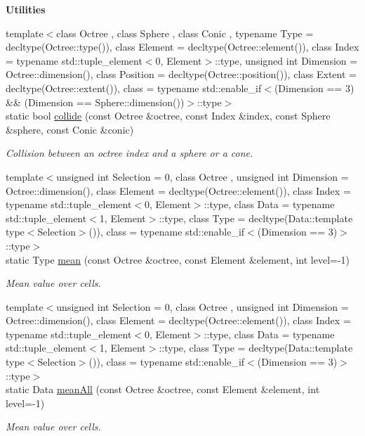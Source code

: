 \begin{Indent}{\bf Utilities}
\begin{DoxyCompactItemize}
{\footnotesize template$<$class Octree , class Sphere , class Conic , typename Type  = decltype(\-Octree\-::type()), class Element  = decltype(\-Octree\-::element()), class Index  = typename std\-::tuple\-\_\-element$<$0, Element$>$\-::type, unsigned int Dimension = Octree\-::dimension(), class Position  = decltype(\-Octree\-::position()), class Extent  = decltype(\-Octree\-::extent()), class  = typename std\-::enable\-\_\-if$<$(\-Dimension == 3) \&\& (\-Dimension == Sphere\-::dimension())$>$\-::type$>$ }\\static bool \hyperlink{exceptionInput_a5b0ea51603590e39e5ca9b9f33e1bf9e}{collide} (const Octree \&octree, const Index \&index, const Sphere \&sphere, const Conic \&conic)
\begin{DoxyCompactList}\small\item\em Collision between an octree index and a sphere or a cone. \end{DoxyCompactList}\item 
{\footnotesize template$<$unsigned int Selection = 0, class Octree , unsigned int Dimension = Octree\-::dimension(), class Element  = decltype(\-Octree\-::element()), class Index  = typename std\-::tuple\-\_\-element$<$0, Element$>$\-::type, class Data  = typename std\-::tuple\-\_\-element$<$1, Element$>$\-::type, class Type  = decltype(\-Data\-::template type$<$\-Selection$>$()), class  = typename std\-::enable\-\_\-if$<$(\-Dimension == 3)$>$\-::type$>$ }\\static Type \hyperlink{exceptionInput_a2378e5cd9538eb69c842ebd4575a6775}{mean} (const Octree \&octree, const Element \&element, int level=-\/1)
\begin{DoxyCompactList}\small\item\em Mean value over cells. \end{DoxyCompactList}\item 
{\footnotesize template$<$unsigned int Selection = 0, class Octree , unsigned int Dimension = Octree\-::dimension(), class Element  = decltype(\-Octree\-::element()), class Index  = typename std\-::tuple\-\_\-element$<$0, Element$>$\-::type, class Data  = typename std\-::tuple\-\_\-element$<$1, Element$>$\-::type, class Type  = decltype(\-Data\-::template type$<$\-Selection$>$()), class  = typename std\-::enable\-\_\-if$<$(\-Dimension == 3)$>$\-::type$>$ }\\static Data \hyperlink{exceptionInput_aa2bca846797d99859c639ee39c5622e3}{mean\-All} (const Octree \&octree, const Element \&element, int level=-\/1)
\begin{DoxyCompactList}\small\item\em Mean value over cells. \end{DoxyCompactList}\item 

\end{DoxyCompactItemize}
\end{Indent}
